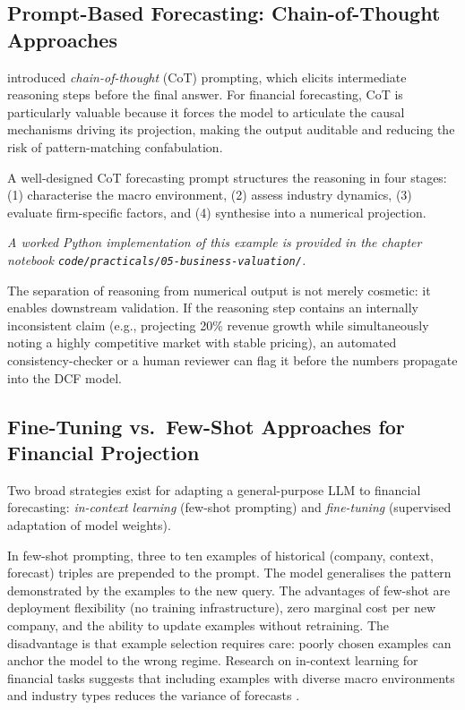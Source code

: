 \begin{deepdive}
\subsection{Prompt-Based Forecasting: Chain-of-Thought Approaches}
\label{subsec:bv-forecasting-cot}

\citet{wei2022chain} introduced \emph{chain-of-thought} (CoT) prompting, which
elicits intermediate reasoning steps before the final answer. For financial
forecasting, CoT is particularly valuable because it forces the model to articulate
the causal mechanisms driving its projection, making the output auditable and reducing
the risk of pattern-matching confabulation.

A well-designed CoT forecasting prompt structures the reasoning in four stages:
(1) characterise the macro environment, (2) assess industry dynamics, (3) evaluate
firm-specific factors, and (4) synthesise into a numerical projection.

\textit{A worked Python implementation of this example is provided in the chapter notebook \texttt{code/practicals/05-business-valuation/}.}

The separation of reasoning from numerical output is not merely cosmetic: it enables
downstream validation. If the reasoning step contains an internally inconsistent claim
(e.g., projecting 20\% revenue growth while simultaneously noting a highly competitive
market with stable pricing), an automated consistency-checker or a human reviewer can
flag it before the numbers propagate into the DCF model.

\subsection{Fine-Tuning vs.\ Few-Shot Approaches for Financial Projection}
\label{subsec:bv-forecasting-finetuning}

Two broad strategies exist for adapting a general-purpose LLM to financial
forecasting: \emph{in-context learning} (few-shot prompting) and
\emph{fine-tuning} (supervised adaptation of model weights).

In few-shot prompting, three to ten examples of historical (company, context, forecast)
triples are prepended to the prompt. The model generalises the pattern demonstrated
by the examples to the new query. The advantages of few-shot are deployment
flexibility (no training infrastructure), zero marginal cost per new company, and the
ability to update examples without retraining. The disadvantage is that example
selection requires care: poorly chosen examples can anchor the model to the wrong
regime. Research on in-context learning for financial tasks suggests that including
examples with diverse macro environments and industry types reduces the variance of
forecasts \cite{brown2020language}.


\end{deepdive}

